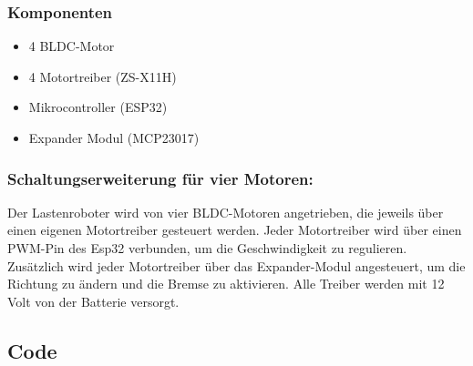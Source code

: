 \documentclass[ngerman,12pt,a4paper]{article}
\begin{document}
			\subsubsection{Komponenten}
			\begin{itemize}
				\item 4 BLDC-Motor
				\item 4 Motortreiber (ZS-X11H)
				\item Mikrocontroller (ESP32)
				\item Expander Modul (MCP23017)
			\end{itemize}
			\newpage
			
			\subsubsection{Schaltungserweiterung für vier Motoren:}
			Der Lastenroboter wird von vier BLDC-Motoren angetrieben, die jeweils über einen eigenen Motortreiber gesteuert werden. Jeder Motortreiber wird über einen PWM-Pin des Esp32 verbunden, um die Geschwindigkeit zu regulieren. Zusätzlich wird jeder Motortreiber über das Expander-Modul angesteuert, um die Richtung zu ändern und die Bremse zu aktivieren. Alle Treiber werden mit 12 Volt von der Batterie versorgt. \\
			\newpage \noindent
		\subsection{Code} 
\end{document}
